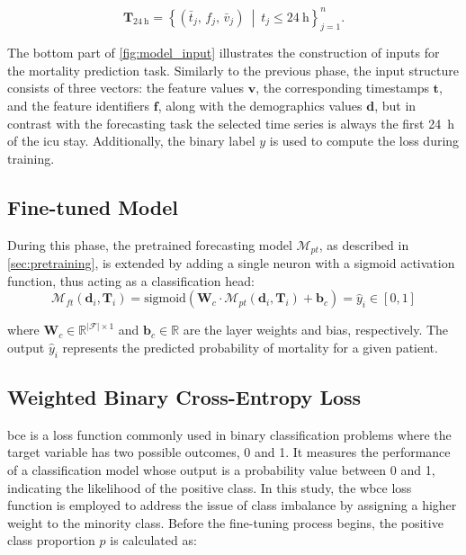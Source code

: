\begin{equation}
    \label{eq:first_24_window}
    \mathbf{T}_{\qty{24}{\hour}} = \left\{ \left( \bar{t}_j, \, f_j, \, \bar{v}_j \right) \ \middle|\ t_j \leq \qty{24}{\hour} \right\}_{j = 1}^{n}.
\end{equation}

The bottom part of \cref{fig:model_input} illustrates the construction of inputs for the mortality prediction task. Similarly to the previous phase, the input structure consists of three vectors: the feature values \( \mathbf{v} \), the corresponding timestamps \( \mathbf{t} \), and the feature identifiers \( \mathbf{f} \), along with the demographics values \( \mathbf{d} \), but in contrast with the forecasting task the selected time series is always the first \qty{24}{\hour} of the \gls{icu} stay. Additionally, the binary label \( y \) is used to compute the loss during training.

\subsection{Fine-tuned Model}

During this phase, the pretrained forecasting model \(\mathcal{M}_{pt} \), as described in \cref{sec:pretraining}, is extended by adding a single neuron with a sigmoid activation function, thus acting as a classification head:
\[
    \mathcal{M}_{ft}(\mathbf{d}_i, \mathbf{T}_i) = \text{sigmoid}(\mathbf{W}_c \cdot \mathcal{M}_{pt}(\mathbf{d}_i, \mathbf{T}_i) + \mathbf{b}_c) = \hat{y}_i \in [0, 1]
\]

where \(\mathbf{W}_c \in \mathbb{R}^{|\mathcal{F}| \times 1}\) and \(\mathbf{b}_c \in \mathbb{R}\) are the layer weights and bias, respectively. The output \(\hat{y}_i\) represents the predicted probability of mortality for a given patient.

\subsection{Weighted Binary Cross-Entropy Loss}

\Gls{bce} is a loss function commonly used in binary classification problems where the target variable has two possible outcomes, \num{0} and \num{1}. It measures the performance of a classification model whose output is a probability value between \num{0} and \num{1}, indicating the likelihood of the positive class. In this study, the \gls{wbce} loss function is employed to address the issue of class imbalance by assigning a higher weight to the minority class. Before the fine-tuning process begins, the positive class proportion \(p\) is calculated as:

